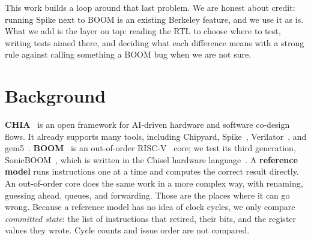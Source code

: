 \documentclass[conference]{IEEEtran}
\begin{document}
This work builds a loop around that last problem. We are honest about credit:
running Spike next to BOOM is an existing Berkeley feature, and we use it as is.
What we add is the layer on top: reading the RTL to choose where to test,
writing tests aimed there, and deciding what each difference means with a strong
rule against calling something a BOOM bug when we are not sure.

\section{Background}
\textbf{CHIA}~\cite{chia} is an open framework for AI-driven hardware and
software co-design flows. It already supports many tools, including
Chipyard, Spike~\cite{spike}, Verilator~\cite{verilator}, and gem5~\cite{gem5}.
\textbf{BOOM}~\cite{boom} is an out-of-order RISC-V~\cite{riscv} core; we test
its third generation, SonicBOOM~\cite{sonicboom}, which is written in the Chisel
hardware language~\cite{chisel}. A
\textbf{reference model} runs instructions one at a time and computes the
correct result directly. An out-of-order core does the same work in a more
complex way, with renaming, guessing ahead, queues, and forwarding. Those are
the places where it can go wrong. Because a reference model has no idea of
clock cycles, we only compare \emph{committed state}: the list of instructions
that retired, their bits, and the register values they wrote. Cycle counts and
issue order are not compared.
\end{document}
